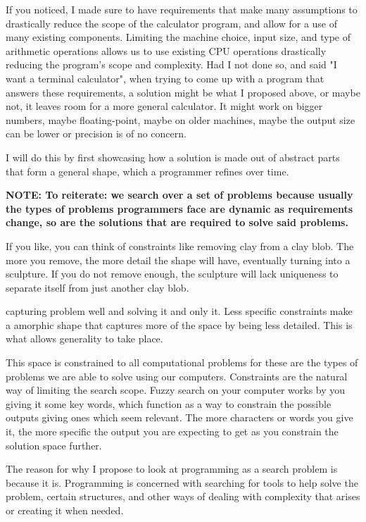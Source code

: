 \documentclass[a4paper]{article}
\begin{document}
If you noticed, I made sure to have requirements that make many assumptions to drastically 
reduce the scope of the calculator program, and allow for a use of many existing components. 
Limiting the machine choice, input size, and type of arithmetic operations allows us to use
existing CPU operations drastically reducing the program's scope and complexity. Had I not 
done so, and said "I want a terminal calculator", when trying to come up with a program that 
answers these requirements, a solution might be what I proposed above, or maybe not, it leaves
room for a more general calculator. It might work on bigger numbers, maybe floating-point,
maybe on older machines, maybe the output size can be lower or precision is of no concern.


I will do this by first showcasing how a solution is made out of abstract parts that form 
a general shape, which a programmer refines over time.

\textbf{NOTE: To reiterate: we search over a set of problems because usually the types of problems programmers face are dynamic as requirements change, so are the solutions that are required to solve said problems.}

If you like, you can think of constraints like removing clay from a clay blob. The more 
you remove, the more detail the shape will have, eventually turning into a sculpture. If 
you do not remove enough, the sculpture will lack uniqueness to separate itself from just 
another clay blob.

capturing problem well and solving it and only it. Less specific 
constraints make a amorphic shape that captures more of the space by being less detailed.
This is what allows generality to take place.

This space is constrained to all computational problems for these are the types of problems we 
are able to solve using our computers. Constraints are the natural way of limiting the search 
scope. Fuzzy search on your computer works by you giving it some key words, which function as
a way to constrain the possible outputs giving ones which seem relevant. The more characters
or words you give it, the more specific the output you are expecting to get as you constrain
the solution space further.

The reason for why I propose to look at programming as a search problem is because it is. 
Programming is concerned with searching for tools to help solve the problem, certain 
structures, and other ways of dealing with complexity that arises or creating it when needed. 
\end{document}
